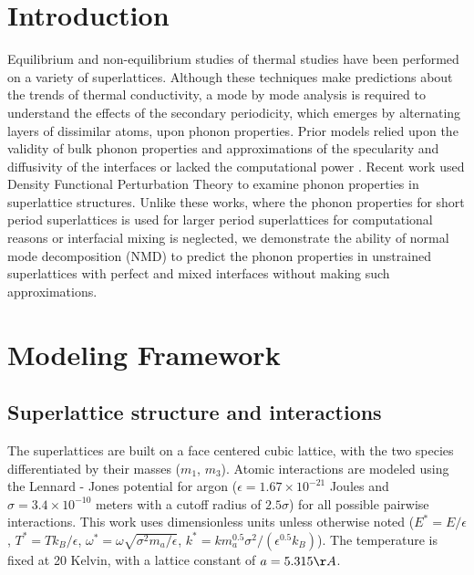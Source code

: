 \documentclass[aps,prb,preprint,preprintnumbers,amsmath,amssymb,floatfix,superscriptaddress]{revtex4}
\begin{document}
\section{Introduction}
Equilibrium \cite {PhysRevB.85.195302} and non-equilibrium \cite {PhysRevB.79.214307,PhysRevB.79.075316,PhysRevB.72.174302} studies of thermal studies have been performed on a variety of superlattices. Although these techniques make predictions about the trends of thermal conductivity, a mode by mode analysis is required to understand the effects of the secondary periodicity, which emerges by alternating layers of dissimilar atoms, upon phonon properties. Prior models relied upon the validity of bulk phonon properties\cite{walkauskas:2579,chen:220} and approximations of the specularity and diffusivity of the interfaces \cite {PhysRevB.57.14958} or lacked the computational power \cite {PhysRevB.70.081310}. Recent work used Density Functional Perturbation Theory to examine phonon properties in superlattice structures.\cite{Luckyanova16112012,doi:10.1021/nl202186y} Unlike these works, where the phonon properties for short period superlattices is used for larger period superlattices for computational reasons \cite{Luckyanova16112012, doi:10.1021/nl202186y} or interfacial mixing is neglected,\cite{doi:10.1021/nl202186y} we demonstrate the ability of normal mode decomposition (NMD) to predict the phonon properties in unstrained superlattices with perfect and mixed interfaces without making such approximations.
\section{Modeling Framework}
\subsection{Superlattice structure and interactions}\label{SEC:sl_struc}
The superlattices are built on a face centered cubic lattice,  with the two species differentiated by their masses ($m_1$, $m_3$). Atomic interactions are modeled using the Lennard - Jones potential for argon ($\epsilon= 1.67\times10^{-21}$ Joules and $\sigma= 3.4\times10^{-10}$ meters with a cutoff radius of $2.5\sigma$) for all possible pairwise interactions. This work uses dimensionless units unless otherwise noted ($E^*=E/\epsilon$, $T^*=Tk_B/\epsilon$, $\omega^*=\omega\sqrt{\sigma^2m_a/\epsilon}$, $k^*=km^{0.5}_a\sigma^2/(\epsilon^{0.5}k_B)$). The temperature is fixed at 20 Kelvin, with a lattice constant of $a=5.315 \AA$.\cite{alan}
\end{document}
